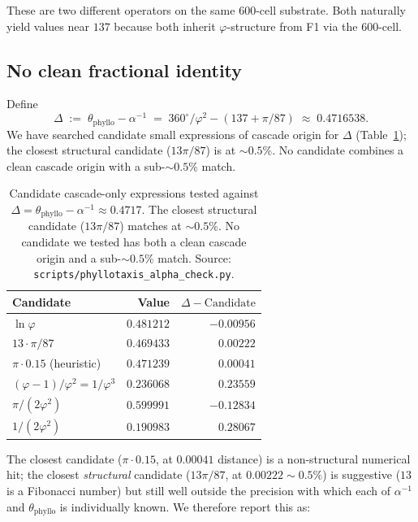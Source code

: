 \documentclass[12pt]{article}
\newcommand{\phig}{\varphi}
\begin{document}
These are two different operators on the same $600$-cell substrate.
Both naturally yield values near $137$ because both inherit
$\phig$-structure from F1 via the $600$-cell.

\subsection{No clean fractional identity}

Define
\[
    \Delta \;:=\; \theta_{\mathrm{phyllo}} - \alpha^{-1}
    \;=\; 360^{\circ}/\phig^2 - (137 + \pi/87)
    \;\approx\; 0.4716538.
\]
We have searched candidate small expressions of cascade origin
for $\Delta$ (Table~\ref{tab:delta-candidates}); the closest
structural candidate ($13\pi/87$) is at $\sim 0.5\%$. No candidate
combines a clean cascade origin with a sub-$\sim 0.5\%$ match.

\begin{table}[h]
\centering
\caption{Candidate cascade-only expressions tested against
$\Delta = \theta_{\mathrm{phyllo}} - \alpha^{-1} \approx 0.4717$.
The closest structural candidate ($13\pi/87$) matches at
$\sim 0.5\%$. No candidate we tested has both a clean cascade
origin and a sub-$\sim 0.5\%$ match. Source:
\texttt{scripts/phyllotaxis\_alpha\_check.py}.}
\label{tab:delta-candidates}
\begin{tabular}{@{}lrr@{}}
\toprule
Candidate & Value & $\Delta - \mathrm{Candidate}$ \\
\midrule
$\ln \phig$ & $0.481212$ & $-0.00956$ \\
$13 \cdot \pi/87$ & $0.469433$ & $\phantom{-}0.00222$ \\
$\pi \cdot 0.15$ (heuristic) & $0.471239$ & $\phantom{-}0.00041$ \\
$(\phig - 1)/\phig^2 = 1/\phig^3$ & $0.236068$ & $\phantom{-}0.23559$ \\
$\pi/(2\phig^2)$ & $0.599991$ & $-0.12834$ \\
$1/(2\phig^2)$ & $0.190983$ & $\phantom{-}0.28067$ \\
\bottomrule
\end{tabular}
\end{table}

The closest candidate ($\pi \cdot 0.15$, at $0.00041$ distance) is
a non-structural numerical hit; the closest \emph{structural}
candidate ($13\pi/87$, at $0.00222 \sim 0.5\%$) is suggestive
($13$ is a Fibonacci number) but still well outside the precision
with which each of $\alpha^{-1}$ and $\theta_{\mathrm{phyllo}}$ is
individually known. We therefore report this as:
\end{document}
